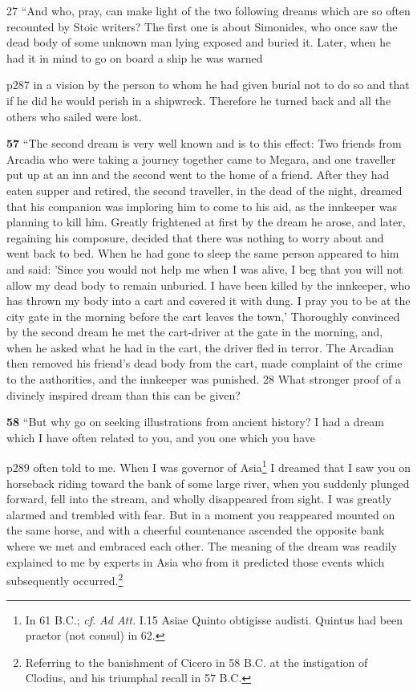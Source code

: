 27
``And who, pray, can make light of the two following dreams which are so often recounted by Stoic writers? The first one is about Simonides, who once saw the dead body of some unknown man lying exposed and buried it. Later, when he had it in mind to go on board a ship he was warned

p287 in a vision by the person to whom he had given burial not to do so and that if he did he would perish in a shipwreck. Therefore he turned back and all the others who sailed were lost.

\textbf{57} ``The second dream is very well known and is to this effect: Two friends from Arcadia who were taking a journey together came to Megara, and one traveller put up at an inn and the second went to the home of a friend. After they had eaten supper and retired, the second traveller, in the dead of the night, dreamed that his companion was imploring him to come to his aid, as the innkeeper was planning to kill him. Greatly frightened at first by the dream he arose, and later, regaining his composure, decided that there was nothing to worry about and went back to bed. When he had gone to sleep the same person appeared to him and said: 'Since you would not help me when I was alive, I beg that you will not allow my dead body to remain unburied. I have been killed by the innkeeper, who has thrown my body into a cart and covered it with dung. I pray you to be at the city gate in the morning before the cart leaves the town,' Thoroughly convinced by the second dream he met the cart-driver at the gate in the morning, and, when he asked what he had in the cart, the driver fled in terror. The Arcadian then removed his friend's dead body from the cart, made complaint of the crime to the authorities, and the innkeeper was punished. 28 What stronger proof of a divinely inspired dream than this can be given?

\textbf{58} ``But why go on seeking illustrations from ancient history? I had a dream which I have often related to you, and you one which you have

p289 often told to me. When I was governor of Asia\texthebrew{}\footnote{In 61 B.C.; \emph{cf.} \emph{Ad Att.} I.15 Asiae Quinto obtigisse audisti. Quintus had been praetor (not consul) in 62.

} I dreamed that I saw you on horseback riding toward the bank of some large river, when you suddenly plunged forward, fell into the stream, and wholly disappeared from sight. I was greatly alarmed and trembled with fear. But in a moment you reappeared mounted on the same horse, and with a cheerful countenance ascended the opposite bank where we met and embraced each other. The meaning of the dream was readily explained to me by experts in Asia who from it predicted those events which subsequently occurred.\footnote{Referring to the banishment of Cicero in 58 B.C. at the instigation of Clodius, and his triumphal recall in 57 B.C.

}

